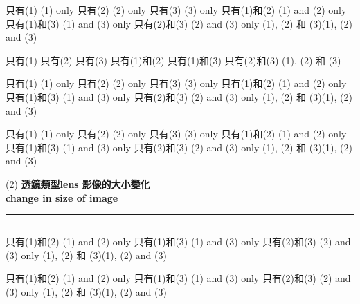 \begin{tasks}
    \task 只有(1) \tab (1) only
    \task 只有(2) \tab (2) only
    \task 只有(3) \tab (3) only
    \task 只有(1)和(2) \tab (1) and (2) only
    \task 只有(1)和(3) \tab (1) and (3) only
    \task 只有(2)和(3) \tab (2) and (3) only
    \task (1), (2) 和 (3)\tab (1), (2) and (3)
\end{tasks}

\begin{tasks}
    \task 只有(1)
    \task 只有(2)
    \task 只有(3)
    \task 只有(1)和(2)
    \task 只有(1)和(3)
    \task 只有(2)和(3)
    \task (1), (2) 和 (3)
\end{tasks}

\begin{tasks}
    \task 只有(1) \tab\tab (1) only
    \task 只有(2) \tab\tab (2) only
    \task 只有(3) \tab\tab (3) only
    \task 只有(1)和(2) \tab\tab (1) and (2) only
    \task 只有(1)和(3) \tab\tab (1) and (3) only
    \task 只有(2)和(3) \tab\tab (2) and (3) only
    \task (1), (2) 和 (3)\tab\tab (1), (2) and (3)
\end{tasks}

\begin{tasks} [before-skip=0em,after-item-skip=0em]
    \task 只有(1) \tab (1) only
    \task 只有(2) \tab (2) only
    \task 只有(3) \tab (3) only
    \task 只有(1)和(2) \tab (1) and (2) only
    \task 只有(1)和(3) \tab (1) and (3) only
    \task 只有(2)和(3) \tab (2) and (3) only
    \task (1), (2) 和 (3)\tab (1), (2) and (3)
\end{tasks}

\begin{tasks}[item-indent=2em,label-offset=0em,before-skip=0em,after-item-skip=.8em](2)
    \task [] \textbf{透鏡類型lens}
    \task [] \textbf{影像的大小變化\\change in size of image}
    \task [] \rule{1.5in}{.5pt}
    \task [] \rule{1.5in}{.5pt}

\end{tasks}

\begin{choices}
    \choice 只有(1)和(2) \tab (1) and (2) only
    \choice 只有(1)和(3) \tab (1) and (3) only
    \choice 只有(2)和(3) \tab (2) and (3) only
    \choice (1), (2) 和 (3)\tab (1), (2) and (3)
\end{choices}
\begin{choices}
    \choice 只有(1)和(2) \tab (1) and (2) only
    \choice 只有(1)和(3) \tab (1) and (3) only
    \choice 只有(2)和(3) \tab (2) and (3) only
    \choice (1), (2) 和 (3)\tab (1), (2) and (3)
\end{choices}


